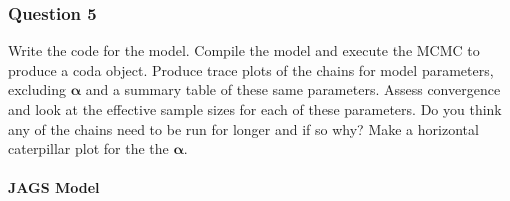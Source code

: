\documentclass[
]{article}
\begin{document}
\hypertarget{question-5-2}{%
\subsubsection{Question 5}\label{question-5-2}}

Write the code for the model. Compile the model and execute the MCMC to
produce a coda object. Produce trace plots of the chains for model
parameters, excluding \(\boldsymbol{\alpha}\) and a summary table of
these same parameters. Assess convergence and look at the effective
sample sizes for each of these parameters. Do you think any of the
chains need to be run for longer and if so why? Make a horizontal
caterpillar plot for the the \(\boldsymbol{\alpha}\).

\hypertarget{jags-model-2}{%
\paragraph{JAGS Model}\label{jags-model-2}}
\end{document}
